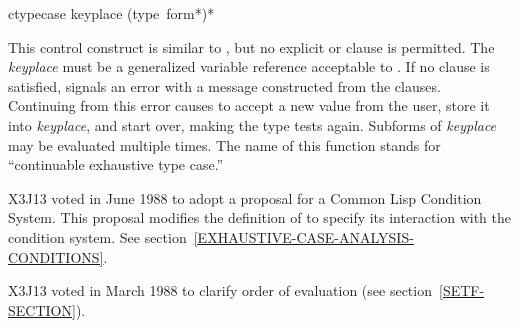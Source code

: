 \begin{defmac}
ctypecase keyplace {(type {\,form}*)}*

\begin{obsolete}\noindent
This control construct is similar to ,
but no explicit  or  clause is permitted.
The {\it keyplace} must be a generalized variable reference
acceptable to .  If no clause is satisfied,  signals an
error with a message constructed from the clauses.  Continuing from this
error causes  to accept a new value from the user, store
it into {\it keyplace}, and start over, making the type tests again.
Subforms of {\it keyplace} may be evaluated multiple times.  The name
of this function stands for ``continuable exhaustive type case.''
\end{obsolete}

\begin{new}
X3J13 voted in June 1988
to adopt a proposal for a Common Lisp Condition System. 
This proposal modifies the definition of  to specify its
interaction with the condition system.
See section~\ref{EXHAUSTIVE-CASE-ANALYSIS-CONDITIONS}.
\end{new}

\begin{newer}
X3J13 voted in March 1988 
to clarify order of evaluation (see section~\ref{SETF-SECTION}).
\end{newer}
\end{defmac}

